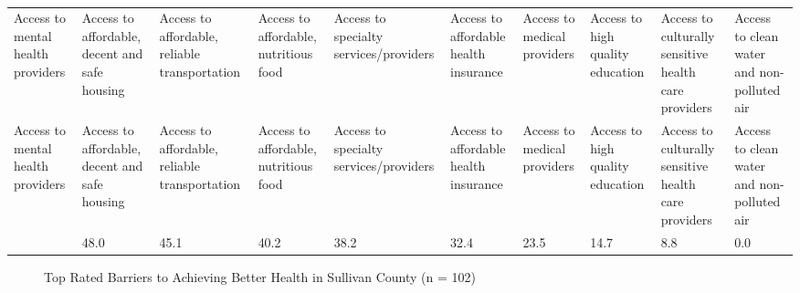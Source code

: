 \documentclass[
  english,
  letterpaper,
]{report}
\begin{document}
\begin{longtable}[]{@{}llllllllll@{}}

\caption{\label{tbl-sc-affect-health}Top Rated Issues That Affect Health
in Sullivan County (n = 102)}

\tabularnewline

\caption{}\label{T_270cf}\tabularnewline
\toprule\noalign{}
Access to mental health providers & Access to affordable, decent and
safe housing & Access to affordable, reliable transportation & Access to
affordable, nutritious food & Access to specialty services/providers &
Access to affordable health insurance & Access to medical providers &
Access to high quality education & Access to culturally sensitive health
care providers & Access to clean water and non-polluted air \\
\midrule\noalign{}
\endfirsthead
\toprule\noalign{}
Access to mental health providers & Access to affordable, decent and
safe housing & Access to affordable, reliable transportation & Access to
affordable, nutritious food & Access to specialty services/providers &
Access to affordable health insurance & Access to medical providers &
Access to high quality education & Access to culturally sensitive health
care providers & Access to clean water and non-polluted air \\
\midrule\noalign{}
\endhead
\bottomrule\noalign{}
\endlastfoot
49.0 & 48.0 & 45.1 & 40.2 & 38.2 & 32.4 & 23.5 & 14.7 & 8.8 & 0.0 \\

\end{longtable}

\begin{figure}


\caption{\label{fig-sc-achieve-health}Top Rated Barriers to Achieving
Better Health in Sullivan County (n = 102)}

\end{figure}%
\end{document}
